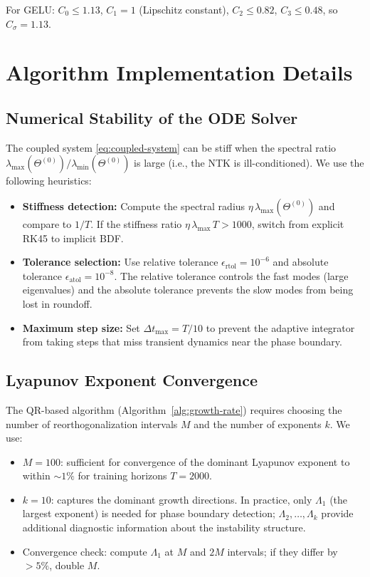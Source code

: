 \documentclass[11pt]{article}
\theoremstyle{definition}
\renewcommand{\Theta}{\varTheta}
\begin{document}
For GELU: $C_0 \le 1.13$, $C_1 = 1$ (Lipschitz constant), $C_2 \le 0.82$, $C_3 \le 0.48$, so $C_\sigma = 1.13$.

\section{Algorithm Implementation Details}
\label{app:implementation}

\subsection{Numerical Stability of the ODE Solver}

The coupled system \eqref{eq:coupled-system} can be stiff when the spectral ratio $\lambda_{\max}(\Theta^{(0)})/\lambda_{\min}(\Theta^{(0)})$ is large (i.e., the NTK is ill-conditioned). We use the following heuristics:

\begin{itemize}[leftmargin=*]
\item \textbf{Stiffness detection:} Compute the spectral radius $\eta\,\lambda_{\max}(\Theta^{(0)})$ and compare to $1/T$. If the stiffness ratio $\eta\,\lambda_{\max}\,T > 1000$, switch from explicit RK45 to implicit BDF.
\item \textbf{Tolerance selection:} Use relative tolerance $\epsilon_{\mathrm{rtol}} = 10^{-6}$ and absolute tolerance $\epsilon_{\mathrm{atol}} = 10^{-8}$. The relative tolerance controls the fast modes (large eigenvalues) and the absolute tolerance prevents the slow modes from being lost in roundoff.
\item \textbf{Maximum step size:} Set $\Delta t_{\max} = T/10$ to prevent the adaptive integrator from taking steps that miss transient dynamics near the phase boundary.
\end{itemize}

\subsection{Lyapunov Exponent Convergence}

The QR-based algorithm (Algorithm~\ref{alg:growth-rate}) requires choosing the number of reorthogonalization intervals $M$ and the number of exponents $k$. We use:

\begin{itemize}[leftmargin=*]
\item $M = 100$: sufficient for convergence of the dominant Lyapunov exponent to within $\sim 1\%$ for training horizons $T = 2000$.
\item $k = 10$: captures the dominant growth directions. In practice, only $\Lambda_1$ (the largest exponent) is needed for phase boundary detection; $\Lambda_2, \ldots, \Lambda_k$ provide additional diagnostic information about the instability structure.
\item Convergence check: compute $\Lambda_1$ at $M$ and $2M$ intervals; if they differ by $> 5\%$, double $M$.
\end{itemize}
\end{document}
